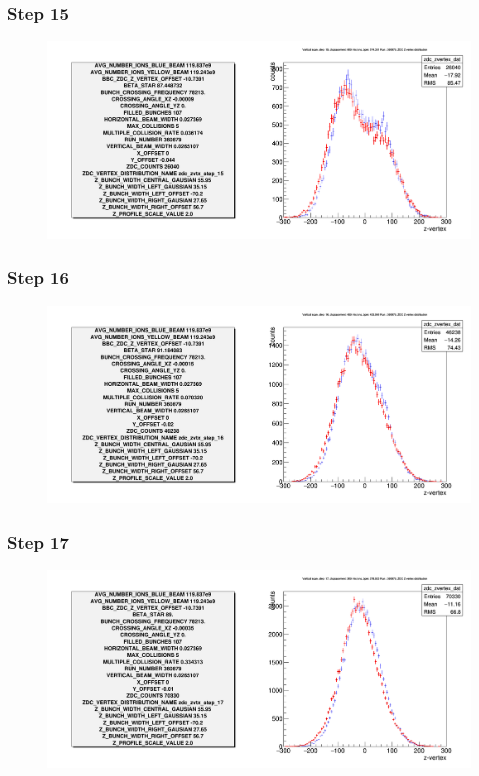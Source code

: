 \begin{frame}
  \frametitle{Step 15}
  \begin{figure}
    \includegraphics[width=\linewidth]{"./figures/tuned_simulation_step_15"}
    \caption{}
    \label{fig:step_15}
  \end{figure}
\end{frame}

\begin{frame}
  \frametitle{Step 16}
  \begin{figure}
    \includegraphics[width=\linewidth]{"./figures/tuned_simulation_step_16"}
    \caption{}
    \label{fig:step_16}
  \end{figure}
\end{frame}

\begin{frame}
  \frametitle{Step 17}
  \begin{figure}
    \includegraphics[width=\linewidth]{"./figures/tuned_simulation_step_17"}
    \caption{}
    \label{fig:step_17}
  \end{figure}
\end{frame}

